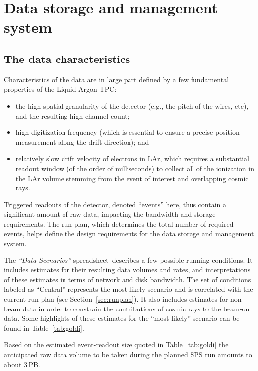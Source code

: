 \section{Data storage and management system}

\subsection{The \pdsp data characteristics}
Characteristics of the \pdsp data are in large part defined by a few fundamental
properties of the \pdsp Liquid Argon TPC:
\begin{itemize}
\item the high spatial granularity of the detector (e.g., the pitch of the wires, etc), and the resulting high channel count;
\item high digitization frequency (which is essential to ensure a precise position measurement along the drift direction); and
\item relatively slow drift velocity of electrons in LAr, which requires a substantial readout window (of the order of milliseconds)  to collect
all of the ionization in the LAr volume stemming from the event of interest and overlapping cosmic rays.
\end{itemize}

Triggered readouts of the detector, denoted ``events'' here, 
thus contain a significant amount of raw data, impacting the bandwidth and
storage requirements.   The run plan, which determines the total number of required events, 
helps define the design requirements for the data storage and management system.

The \textit{``\pdsp Data Scenarios''} spreadsheet\,\cite{data_spreadsheet}  %
describes a few possible running conditions. It includes estimates for their
resulting data volumes and rates, and interpretations of these estimates in terms of
network and disk bandwidth. The set of conditions labeled as ``Central'' represents the most likely scenario
and is correlated with the current run plan (see Section~\ref{sec:runplan}).
 It also includes estimates for non-beam
data in order to constrain the contributions of cosmic rays to the beam-on data.  Some highlights
of these estimates for the ``most likely'' scenario
can be found in Table~\ref{tab:goldi}.

Based on the estimated event-readout size quoted in Table~\ref{tab:goldi}  the anticipated raw data volume to be taken during the planned SPS run
amounts to about 3\,PB.



